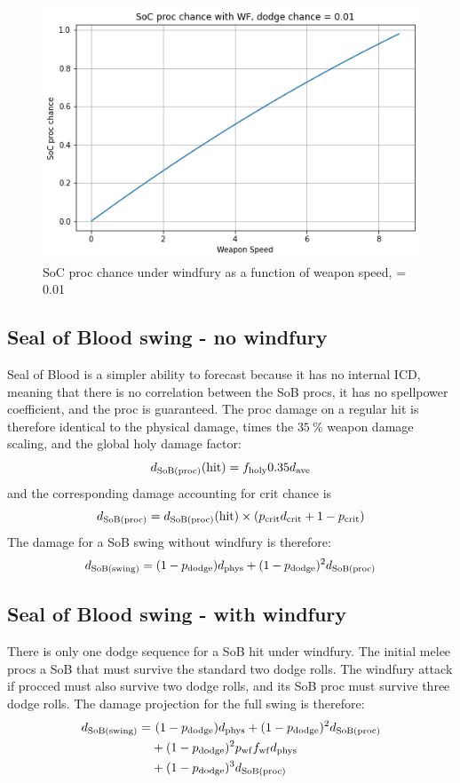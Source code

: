 \begin{figure}[ht] 
	\centering \includegraphics[width=0.84\columnwidth]{figs/wf_soc_1.png}
	\caption{SoC proc chance under windfury as a function of weapon speed, \pdodge = 0.01}
	\label{fig:soc_wf}
\end{figure}

\newpage
\subsection{Seal of Blood swing - no windfury}
Seal of Blood is a simpler ability to forecast because it has no internal ICD, meaning that there is no correlation between the SoB procs, it has no spellpower coefficient, and the proc is guaranteed.
The proc damage on a regular hit is therefore identical to the physical damage, times the $35~\%$ weapon damage scaling, and the global holy damage factor:
\begin{equation}
		d_\mathrm{SoB(proc)} (\mathrm{hit}) = f_{\mathrm{holy}}  0.35  d_{\mathrm{ave}} 
\end{equation}
and the corresponding damage accounting for crit chance is
\begin{equation}
	d_\mathrm{SoB(proc)}  = d_\mathrm{SoB(proc)} (\mathrm{hit}) \times (p_{\mathrm{crit}}  d_{\mathrm{crit}}  + 1 - p_{\mathrm{crit}} )
\end{equation}
The damage for a SoB swing without windfury is therefore:
\begin{equation}
	d_\mathrm{SoB(swing)}  = (1 - p_{\mathrm{dodge}} ) d_{\mathrm{phys}}  + (1-p_{\mathrm{dodge}} )^2 d_\mathrm{SoB(proc)} 
\end{equation}

\subsection{Seal of Blood swing - with windfury}
There is only one dodge sequence for a SoB hit under windfury.
The initial melee procs a SoB that must survive the standard two dodge rolls.
The windfury attack if procced must also survive two dodge rolls, and its SoB proc must survive three dodge rolls.
The damage projection for the full swing is therefore:
\begin{equation*}
	\begin{aligned}
		d_\mathrm{SoB(swing)}  =&~ (1 - p_{\mathrm{dodge}} ) d_{\mathrm{phys}}  + (1-p_{\mathrm{dodge}} )^2 d_\mathrm{SoB(proc)}  \\
		&+ (1-p_{\mathrm{dodge}} )^2 p_{\mathrm{wf}}  f_{\mathrm{wf}}  d_{\mathrm{phys}}  \\
		&+ (1-p_{\mathrm{dodge}} )^3 d_\mathrm{SoB(proc)} 
	\end{aligned}
\end{equation*}


